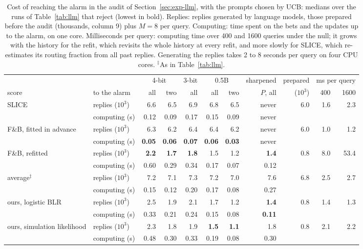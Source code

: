 \documentclass[11pt]{article}
\theoremstyle{remark}
\begin{document}
\begin{table}[t]
\centering
\caption{Cost of reaching the alarm in the audit of
Section~\ref{sec:exp-llm}, with the prompts chosen by UCB: medians over the
runs of Table~\ref{tab:llm} that reject (lowest in bold). Replies: replies
generated by language models, those prepared before the audit (thousands,
column 9) plus $M = 8$ per query. Computing: time spent on the bets and the
updates up to the alarm, on one core. Milliseconds per query: computing time
over 400 and 1600 queries under the null; it grows with the history for the
refit, which revisits the whole history at every refit, and more slowly for
SLICE, which re-estimates its routing fraction from all past replies.
Generating the replies takes 2 to 8 seconds per query on four CPU cores.
$^\ddagger$As in Table~\ref{tab:llm}.}
\label{tab:llmcost}
\small
\setlength{\tabcolsep}{4pt}
\begin{adjustbox}{max width=\textwidth}
\begin{tabular}{llrrrrrrrrr}
\toprule
 & & \multicolumn{2}{c}{4-bit} & 3-bit & \multicolumn{2}{c}{0.5B} & sharpened & prepared & \multicolumn{2}{c}{ms per query} \\
\cmidrule(lr){3-4}\cmidrule(lr){5-5}\cmidrule(lr){6-7}\cmidrule(lr){8-8}\cmidrule(lr){10-11}
score & to the alarm & all & two & all & all & two & $P$, all & ($10^3$) & 400 & 1600 \\
\midrule
SLICE & replies ($10^3$) & 6.6 & 6.5 & 6.9 & 6.8 & 6.5 & never & 6.0 & 1.6 & 2.3 \\
 & computing (s) & 0.12 & 0.09 & 0.17 & 0.15 & 0.09 & never & & & \\
\addlinespace[3pt]
F\&B, fitted in advance & replies ($10^3$) & 6.3 & 6.2 & 6.4 & 6.4 & 6.2 & never & 6.0 & 1.0 & 1.2 \\
 & computing (s) & \textbf{0.05} & \textbf{0.06} & \textbf{0.07} & \textbf{0.06} & \textbf{0.03} & never & & & \\
\addlinespace[3pt]
F\&B, refitted & replies ($10^3$) & \textbf{2.2} & \textbf{1.7} & \textbf{1.8} & 1.5 & 1.2 & \textbf{1.4} & 0.8 & 8.0 & 53.4 \\
 & computing (s) & 0.60 & 0.29 & 0.34 & 0.17 & 0.07 & 0.12 & & & \\
\addlinespace[3pt]
average$^\ddagger$ & replies ($10^3$) & 7.2 & 7.1 & 7.3 & 7.2 & 7.0 & 7.6 & 6.8 & 2.5 & 2.7 \\
 & computing (s) & 0.15 & 0.12 & 0.20 & 0.17 & 0.08 & 0.27 & & & \\
\addlinespace[3pt]
ours, logistic BLR & replies ($10^3$) & 2.5 & 1.9 & 2.1 & 1.7 & 1.2 & \textbf{1.4} & 0.8 & 1.4 & 1.3 \\
 & computing (s) & 0.33 & 0.21 & 0.24 & 0.15 & 0.08 & \textbf{0.11} & & & \\
\addlinespace[3pt]
ours, simulation likelihood & replies ($10^3$) & 2.3 & 1.8 & 1.9 & \textbf{1.5} & \textbf{1.1} & 1.8 & 0.8 & 2.1 & 2.2 \\
 & computing (s) & 0.48 & 0.30 & 0.33 & 0.19 & 0.08 & 0.30 & & & \\
\bottomrule
\end{tabular}
\end{adjustbox}
\end{table}
\end{document}
